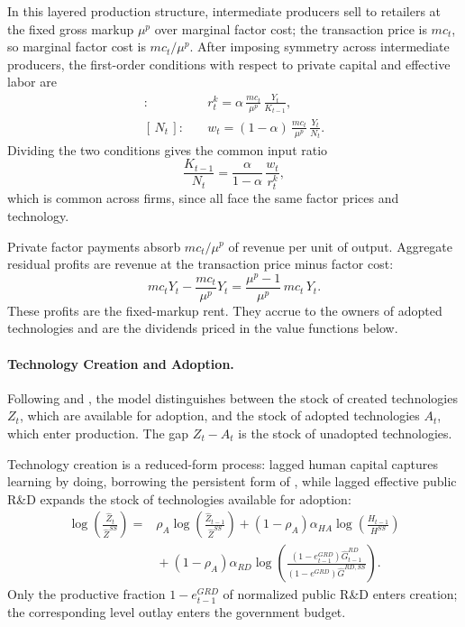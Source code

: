 \documentclass[a4paper,11pt]{article}
\begin{document}
In this layered production structure, intermediate producers sell to retailers at the fixed gross markup $\mu^{p}$ over marginal factor cost; the transaction price is $mc_t$, so marginal factor cost is $mc_t/\mu^{p}$.
After imposing symmetry across intermediate producers, the first-order conditions with respect to private capital and effective labor are
\begin{align*}
    [\,K_{t-1}\,]:&\quad r_t^{k} = \alpha\, \frac{mc_t}{\mu^{p}}\, \frac{Y_t}{K_{t-1}}, \\
    [\,N_t\,]:&\quad w_t = (1-\alpha)\, \frac{mc_t}{\mu^{p}}\, \frac{Y_t}{N_t}.
\end{align*}
Dividing the two conditions gives the common input ratio
\[
    \frac{K_{t-1}}{N_t} = \frac{\alpha}{1-\alpha}\, \frac{w_t}{r_t^{k}},
\]
which is common across firms, since all face the same factor prices and technology.

Private factor payments absorb $mc_t/\mu^{p}$ of revenue per unit of output.
Aggregate residual profits are revenue at the transaction price minus factor cost:
\[
    mc_t Y_t - \frac{mc_t}{\mu^{p}}Y_t
    = \frac{\mu^{p}-1}{\mu^{p}}\, mc_t\, Y_t.
\]
These profits are the fixed-markup rent.
They accrue to the owners of adopted technologies and are the dividends priced in the value functions below.

\paragraph{Technology Creation and Adoption.}
Following \citet{CominGertler2006} and \citet{Anzoateguietal2019}, the model distinguishes between the stock of created technologies $Z_t$, which are available for adoption, and the stock of adopted technologies $A_t$, which enter production.
The gap $Z_t-A_t$ is the stock of unadopted technologies.

Technology creation is a reduced-form process: lagged human capital captures learning by doing, borrowing the persistent form of \citet{ChangGomesSchorfheide2002}, while lagged effective public R\&D expands the stock of technologies available for adoption:
\[
\begin{aligned}
    \log\!\left(\frac{\hat{Z}_t}{\hat{Z}^{SS}}\right) ={}& \rho_A \log\!\left(\frac{\hat{Z}_{t-1}}{\hat{Z}^{SS}}\right)
    + \left(1-\rho_A\right)\alpha_{HA} \log\!\left(\frac{H_{t-1}}{H^{SS}}\right) \\
    &{}+ \left(1-\rho_A\right)\alpha_{RD} \log\!\left(\frac{\left(1-e_{t-1}^{GRD}\right) \hat{G}_{t-1}^{RD}}{\left(1-e^{GRD}\right) \hat{G}^{RD,SS}}\right).
\end{aligned}
\]
Only the productive fraction $1-e_{t-1}^{GRD}$ of normalized public R\&D enters creation; the corresponding level outlay enters the government budget.
\end{document}
